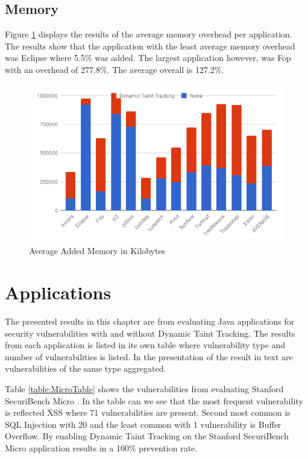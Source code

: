 \subsection{Memory}
Figure \ref{fig:Memory} displays the results of the average memory overhead per application. The results show that the application with the least average memory overhead was Eclipse where 5.5\% was added. The largest application however, was Fop with an overhead of 277.8\%. The average overall is 127.2\%.

\begin{figure}[!hbt]
	\centering
	\includegraphics[width=\textwidth]{images/Memory.png}
	\caption{Average Added Memory in Kilobytes}
	\label{fig:Memory}
\end{figure}



\section{Applications}
\label{Applications}
The presented results in this chapter are from evaluating Java applications for security vulnerabilities with and without Dynamic Taint Tracking. The results from each application is listed in its own table where vulnerability type and number of vulnerabilities is listed. In the presentation of the result in text are vulnerabilities of the same type aggregated.

Table \ref{table:MicroTable} shows the vulnerabilities from evaluating Stanford SecuriBench Micro \parencite{securiBenchMicro}. In the table can we see that the most frequent vulnerability is reflected XSS where 71 vulnerabilities are present. Second most common is SQL Injection with 20 and the least common with 1 vulnerability is Buffer Overflow. By enabling Dynamic Taint Tracking on the Stanford SecuriBench Micro \parencite{securiBenchMicro} application results in a 100\% prevention rate.

